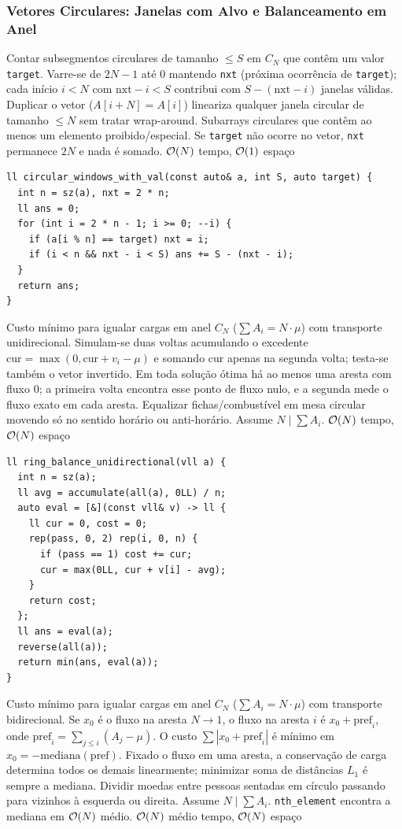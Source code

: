 \subsubsection{Vetores Circulares: Janelas com Alvo e Balanceamento em Anel}
\algobox
  {Contar subsegmentos circulares de tamanho $\le S$ em $C_N$ que contêm um valor \texttt{target}.}
  {Varre-se de $2N - 1$ até $0$ mantendo \texttt{nxt} (próxima ocorrência de \texttt{target}); cada início $i < N$ com $\text{nxt} - i < S$ contribui com $S - (\text{nxt} - i)$ janelas válidas.}
  {Duplicar o vetor ($A[i+N] = A[i]$) lineariza qualquer janela circular de tamanho $\le N$ sem tratar wrap-around.}
  {Subarrays circulares que contêm ao menos um elemento proibido/especial.}
  {Se \texttt{target} não ocorre no vetor, \texttt{nxt} permanece $2N$ e nada é somado.}
  {$\mathcal{O}(N)$ tempo, $\mathcal{O}(1)$ espaço}

\begin{lstlisting}
ll circular_windows_with_val(const auto& a, int S, auto target) {
  int n = sz(a), nxt = 2 * n;
  ll ans = 0;
  for (int i = 2 * n - 1; i >= 0; --i) {
    if (a[i % n] == target) nxt = i;
    if (i < n && nxt - i < S) ans += S - (nxt - i);
  }
  return ans;
}
\end{lstlisting}

\algobox
  {Custo mínimo para igualar cargas em anel $C_N$ ($\sum A_i = N \cdot \mu$) com transporte unidirecional.}
  {Simulam-se duas voltas acumulando o excedente $\text{cur} = \max(0, \text{cur} + v_i - \mu)$ e somando $\text{cur}$ apenas na segunda volta; testa-se também o vetor invertido.}
  {Em toda solução ótima há ao menos uma aresta com fluxo $0$; a primeira volta encontra esse ponto de fluxo nulo, e a segunda mede o fluxo exato em cada aresta.}
  {Equalizar fichas/combustível em mesa circular movendo só no sentido horário ou anti-horário.}
  {Assume $N \mid \sum A_i$.}
  {$\mathcal{O}(N)$ tempo, $\mathcal{O}(N)$ espaço}

\begin{lstlisting}
ll ring_balance_unidirectional(vll a) {
  int n = sz(a);
  ll avg = accumulate(all(a), 0LL) / n;
  auto eval = [&](const vll& v) -> ll {
    ll cur = 0, cost = 0;
    rep(pass, 0, 2) rep(i, 0, n) {
      if (pass == 1) cost += cur;
      cur = max(0LL, cur + v[i] - avg);
    }
    return cost;
  };
  ll ans = eval(a);
  reverse(all(a));
  return min(ans, eval(a));
}
\end{lstlisting}

\algobox
  {Custo mínimo para igualar cargas em anel $C_N$ ($\sum A_i = N \cdot \mu$) com transporte bidirecional.}
  {Se $x_0$ é o fluxo na aresta $N \to 1$, o fluxo na aresta $i$ é $x_0 + \text{pref}_i$, onde $\text{pref}_i = \sum_{j \le i}(A_j - \mu)$. O custo $\sum |x_0 + \text{pref}_i|$ é mínimo em $x_0 = -\text{mediana}(\text{pref})$.}
  {Fixado o fluxo em uma aresta, a conservação de carga determina todos os demais linearmente; minimizar soma de distâncias $L_1$ é sempre a mediana.}
  {Dividir moedas entre pessoas sentadas em círculo passando para vizinhos à esquerda ou direita.}
  {Assume $N \mid \sum A_i$. \texttt{nth\_element} encontra a mediana em $\mathcal{O}(N)$ médio.}
  {$\mathcal{O}(N)$ médio tempo, $\mathcal{O}(N)$ espaço}

